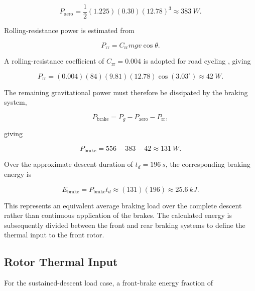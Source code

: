 \documentclass[11pt,a4paper]{article}
\begin{document}
\begin{equation}
    P_{\mathrm{aero}}
    =
    \frac{1}{2}(1.225)(0.30)(12.78)^3
    \approx \SI{383}{W}.
\end{equation}

Rolling-resistance power is estimated from

\begin{equation}
    P_{\mathrm{rr}}
    =
    C_{\mathrm{rr}}mgv\cos\theta.
\end{equation}

A rolling-resistance coefficient of
$C_{\mathrm{rr}}=0.004$ is adopted for road cycling
\cite{Zignoli2025}, giving

\begin{equation}
    P_{\mathrm{rr}}
    =
    (0.004)(84)(9.81)(12.78)\cos(3.03^\circ)
    \approx \SI{42}{W}.
\end{equation}

The remaining gravitational power must therefore be dissipated by the
braking system,

\begin{equation}
    P_{\mathrm{brake}}
    =
    P_g-P_{\mathrm{aero}}-P_{\mathrm{rr}},
\end{equation}

giving

\begin{equation}
    P_{\mathrm{brake}}
    =
    556-383-42
    \approx \SI{131}{W}.
\end{equation}

Over the approximate descent duration of
$t_d=\SI{196}{s}$, the corresponding braking energy is

\begin{equation}
    E_{\mathrm{brake}}
    =
    P_{\mathrm{brake}}t_d
    \approx
    (131)(196)
    \approx
    \SI{25.6}{kJ}.
\end{equation}

This represents an equivalent average braking load over the complete
descent rather than continuous application of the brakes. The calculated
energy is subsequently divided between the front and rear braking systems
to define the thermal input to the front rotor.


\subsection{Rotor Thermal Input}

For the sustained-descent load case, a front-brake energy fraction of
\end{document}
